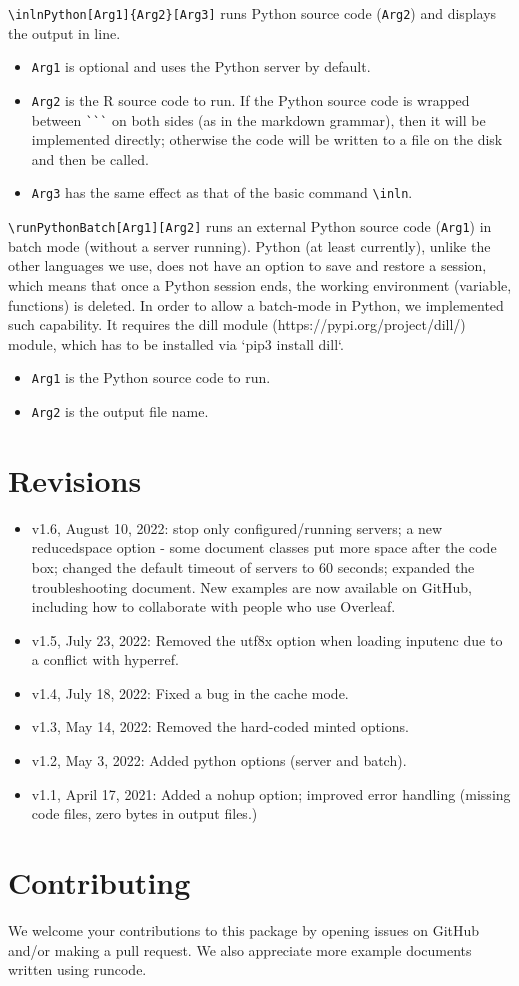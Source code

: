 \documentclass{ltxdoc}
\begin{document}
\noindent \verb|\inlnPython[Arg1]{Arg2}[Arg3]| runs Python source code (\texttt{Arg2}) and displays the output in line.
\begin{itemize}
\item \texttt{Arg1} is optional and uses the Python server by default.
\item \texttt{Arg2} is the R source code to run. If the Python  source code is wrapped between \verb|```| on both sides (as in the markdown grammar), then it will be implemented directly; otherwise the code will be written to a file on the disk and then be called.
\item \texttt{Arg3} has the same effect as that of the basic command  \verb|\inln|.
\end{itemize}

\noindent \verb|\runPythonBatch[Arg1][Arg2]| runs an external Python source code (\texttt{Arg1}) in batch mode (without a server running). Python (at least currently), unlike the other languages we use, does not have an option to save and restore a session, which means that once a Python session ends, the working environment (variable, functions) is deleted. In order to allow a batch-mode in Python, we implemented such capability. It requires the dill module (https://pypi.org/project/dill/) module, which has to be installed via  `pip3 install dill`.
\begin{itemize}
\item \texttt{Arg1} is the Python source code to run.
\item \texttt{Arg2} is the output file name.
\end{itemize}

 


\section{Revisions}
\begin{itemize}
\item v1.6, August 10, 2022: stop only configured/running servers; a new reducedspace option - some document classes put more space after the code box; changed the default timeout of servers to 60 seconds; expanded the troubleshooting document. New examples are now available on GitHub, including how to collaborate with people who use Overleaf.
\item v1.5, July 23, 2022: Removed the utf8x option when loading inputenc due to a conflict with hyperref.
\item v1.4, July 18, 2022: Fixed a bug in the cache mode.
\item v1.3, May 14, 2022: Removed the hard-coded minted options.
\item v1.2, May 3, 2022: Added python options (server and batch).
\item v1.1, April 17, 2021: Added a nohup option; improved error handling (missing code files, zero bytes in output files.)
\end{itemize}


%
\section{Contributing}
We welcome your contributions to this package by opening issues on GitHub and/or making a pull request. We also appreciate more example documents written using \textsf{runcode}.
\end{document}
